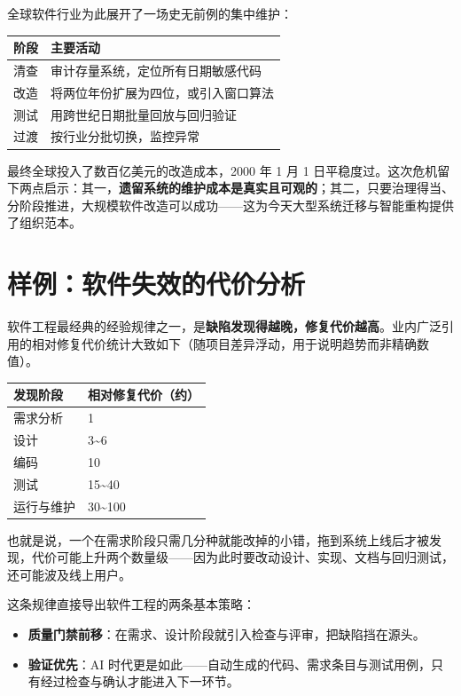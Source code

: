 \documentclass[12pt,a4paper,twoside,openany]{ctexbook}
\numberwithin{figure}{chapter}
\numberwithin{table}{chapter}
\providecommand{\tightlist}{\setlength{\itemsep}{0pt}\setlength{\parskip}{0pt}}
\newcounter{none}
\begin{document}
全球软件行业为此展开了一场史无前例的集中维护：

{\def\LTcaptype{none} %
\begin{longtable}[]{@{}ll@{}}
\toprule\noalign{}
阶段 & 主要活动 \\
\midrule\noalign{}
\endhead
\bottomrule\noalign{}
\endlastfoot
清查 & 审计存量系统，定位所有日期敏感代码 \\
改造 & 将两位年份扩展为四位，或引入窗口算法 \\
测试 & 用跨世纪日期批量回放与回归验证 \\
过渡 & 按行业分批切换，监控异常 \\
\end{longtable}
}

最终全球投入了数百亿美元的改造成本，2000 年 1 月 1
日平稳度过。这次危机留下两点启示：其一，\textbf{遗留系统的维护成本是真实且可观的}；其二，只要治理得当、分阶段推进，大规模软件改造可以成功------这为今天大型系统迁移与智能重构提供了组织范本。

\section{样例：软件失效的代价分析}\label{ux6837ux4f8bux8f6fux4ef6ux5931ux6548ux7684ux4ee3ux4ef7ux5206ux6790}

软件工程最经典的经验规律之一，是\textbf{缺陷发现得越晚，修复代价越高}。业内广泛引用的相对修复代价统计大致如下（随项目差异浮动，用于说明趋势而非精确数值）。

{\def\LTcaptype{none} %
\begin{longtable}[]{@{}ll@{}}
\toprule\noalign{}
发现阶段 & 相对修复代价（约） \\
\midrule\noalign{}
\endhead
\bottomrule\noalign{}
\endlastfoot
需求分析 & 1 \\
设计 & 3\textasciitilde6 \\
编码 & 10 \\
测试 & 15\textasciitilde40 \\
运行与维护 & 30\textasciitilde100 \\
\end{longtable}
}

也就是说，一个在需求阶段只需几分种就能改掉的小错，拖到系统上线后才被发现，代价可能上升两个数量级------因为此时要改动设计、实现、文档与回归测试，还可能波及线上用户。

这条规律直接导出软件工程的两条基本策略：

\begin{itemize}
\tightlist
\item
  \textbf{质量门禁前移}：在需求、设计阶段就引入检查与评审，把缺陷挡在源头。
\item
  \textbf{验证优先}：AI
  时代更是如此------自动生成的代码、需求条目与测试用例，只有经过检查与确认才能进入下一环节。
\end{itemize}
\end{document}
